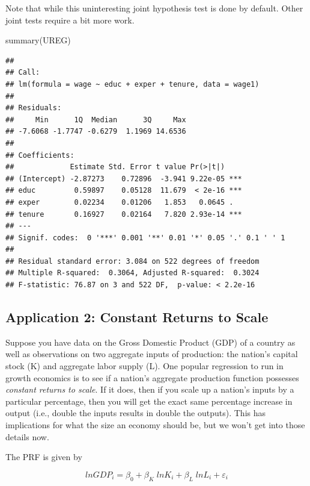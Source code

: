 \documentclass[
]{book}
\newenvironment{Shaded}{\begin{snugshade}}{\end{snugshade}}
\newcommand{\FunctionTok}[1]{\textcolor[rgb]{0.00,0.00,0.00}{#1}}
\newcommand{\NormalTok}[1]{#1}
\begin{document}
Note that while this uninteresting joint hypothesis test is done by default. Other joint tests require a bit more work.

\begin{Shaded}
\begin{Highlighting}[]
\FunctionTok{summary}\NormalTok{(UREG)}
\end{Highlighting}
\end{Shaded}

\begin{verbatim}
## 
## Call:
## lm(formula = wage ~ educ + exper + tenure, data = wage1)
## 
## Residuals:
##     Min      1Q  Median      3Q     Max 
## -7.6068 -1.7747 -0.6279  1.1969 14.6536 
## 
## Coefficients:
##             Estimate Std. Error t value Pr(>|t|)    
## (Intercept) -2.87273    0.72896  -3.941 9.22e-05 ***
## educ         0.59897    0.05128  11.679  < 2e-16 ***
## exper        0.02234    0.01206   1.853   0.0645 .  
## tenure       0.16927    0.02164   7.820 2.93e-14 ***
## ---
## Signif. codes:  0 '***' 0.001 '**' 0.01 '*' 0.05 '.' 0.1 ' ' 1
## 
## Residual standard error: 3.084 on 522 degrees of freedom
## Multiple R-squared:  0.3064, Adjusted R-squared:  0.3024 
## F-statistic: 76.87 on 3 and 522 DF,  p-value: < 2.2e-16
\end{verbatim}

\hypertarget{application-2-constant-returns-to-scale}{%
\subsection*{Application 2: Constant Returns to Scale}\label{application-2-constant-returns-to-scale}}

Suppose you have data on the Gross Domestic Product (GDP) of a country as well as observations on two aggregate inputs of production: the nation's capital stock (K) and aggregate labor supply (L). One popular regression to run in growth economics is to see if a nation's aggregate production function possesses \emph{constant returns to scale}. If it does, then if you scale up a nation's inputs by a particular percentage, then you will get the exact same percentage increase in output (i.e., double the inputs results in double the outputs). This has implications for what the size an economy should be, but we won't get into those details now.

The PRF is given by

\[lnGDP_i = \beta_0 + \beta_K \;lnK_i + \beta_L \;lnL_i + \varepsilon_i\]
\end{document}
